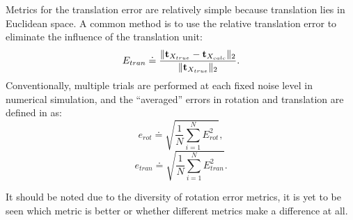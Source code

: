 \documentclass[twocolumn,10pt]{asme2ej}
\newcommand{\ttt}{{\bf t}}
\begin{document}
Metrics for the translation error are relatively simple because translation lies in Euclidean space. A common method is to use the relative translation error to eliminate the influence of the translation unit:
\begin{equation}
E_{tran} \doteq \dfrac{\|\ttt_{X_{true}}-\ttt_{X_{calc}}\|_{2}}{\|\ttt_{X_{true}}\|_{2}}.
\label{TranError}
\end{equation}
Conventionally, multiple trials are performed at each fixed noise level in numerical simulation, and the ``averaged'' errors in rotation and translation are defined in \cite{horaud1995hand} as:
\begin{equation}
e_{rot} \doteq \sqrt{\dfrac{1}{N}\sum_{i=1}^{N} E_{rot}^2},
\end{equation}
\begin{equation}
e_{tran} \doteq \sqrt{\dfrac{1}{N}\sum_{i=1}^{N} E_{tran}^2}.
\end{equation}

It should be noted due to the diversity of rotation error metrics, it is yet to be seen which metric is better or whether different metrics make a difference at all. 

\end{document}
